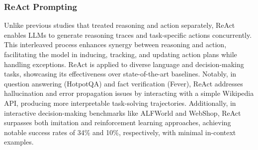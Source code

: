 \documentclass{article}
\begin{document}
\subsubsection{ReAct Prompting}
\label{react}
Unlike previous studies that treated reasoning and action separately, ReAct~\citep{yao2022react} enables LLMs to generate reasoning traces and task-specific actions concurrently. This interleaved process enhances synergy between reasoning and action, facilitating the model in inducing, tracking, and updating action plans while handling exceptions. ReAct is applied to diverse language and decision-making tasks, showcasing its effectiveness over state-of-the-art baselines. Notably, in question answering (HotpotQA) and fact verification (Fever), ReAct addresses hallucination and error propagation issues by interacting with a simple Wikipedia API, producing more interpretable task-solving trajectories. Additionally, in interactive decision-making benchmarks like ALFWorld and WebShop, ReAct surpasses both imitation and reinforcement learning approaches, achieving notable success rates of 34\% and 10\%, respectively, with minimal in-context examples.
\end{document}
